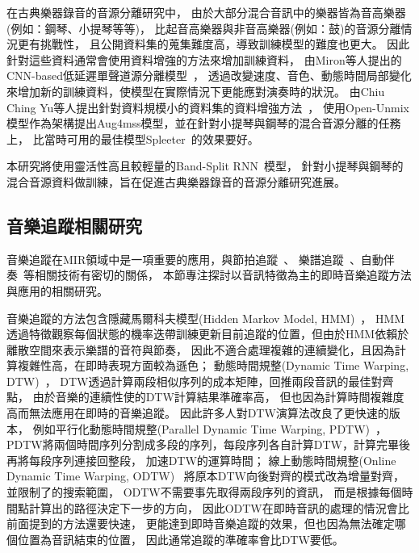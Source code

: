 \documentclass[class=NCU_thesis, crop=false]{standalone}
\begin{document}
在古典樂器錄音的音源分離研究中，
由於大部分混合音訊中的樂器皆為音高樂器(例如：鋼琴、小提琴等等)，
比起音高樂器與非音高樂器(例如：鼓)的音源分離情況更有挑戰性，
且公開資料集的蒐集難度高，導致訓練模型的難度也更大。
因此針對這些資料通常會使用資料增強的方法來增加訓練資料，
由Miron等人提出的CNN-based低延遲單聲道源分離模型~\cite{miron2017generating}，
透過改變速度、音色、動態時間局部變化來增加新的訓練資料，使模型在實際情況下更能應對演奏時的狀況。
由Chiu Ching Yu等人提出針對資料規模小的資料集的資料增強方法~\cite{Chiu_ChingYu2020MixingSpecific}，
使用Open-Unmix模型作為架構提出Aug4mss模型，並在針對小提琴與鋼琴的混合音源分離的任務上，
比當時可用的最佳模型Spleeter~\cite{hennequin2020spleeter}的效果要好。

本研究將使用靈活性高且較輕量的Band-Split RNN~\cite{Luo_Yi2022MusicSourceSeparation}模型，
針對小提琴與鋼琴的混合音源資料做訓練，旨在促進古典樂器錄音的音源分離研究進展。


\subsection{音樂追蹤相關研究}
音樂追蹤在MIR領域中是一項重要的應用，與節拍追蹤~\cite{heydari2021don, goto2021musical, di2021downbeat}、
樂譜追蹤~\cite{henkel2019score}、自動伴奏~\cite{zhang2023design}等相關技術有密切的關係，
本節專注探討以音訊特徵為主的即時音樂追蹤方法與應用的相關研究。

音樂追蹤的方法包含隱藏馬爾科夫模型(Hidden Markov Model, HMM)~\cite{cano1999score}，
HMM透過特徵觀察每個狀態的機率迭帶訓練更新目前追蹤的位置，但由於HMM依賴於離散空間來表示樂譜的音符與節奏，
因此不適合處理複雜的連續變化，且因為計算複雜性高，在即時表現方面較為遜色；
動態時間規整(Dynamic Time Warping, DTW)~\cite{Sakoe1978Dynamic, Arzt2012Adaptive}，
DTW透過計算兩段相似序列的成本矩陣，回推兩段音訊的最佳對齊點，
由於音樂的連續性使的DTW計算結果準確率高，
但也因為計算時間複雜度高而無法應用在即時的音樂追蹤。
因此許多人對DTW演算法改良了更快速的版本，
例如平行化動態時間規整(Parallel Dynamic Time Warping, PDTW)~\cite{takahashi2009parallelized, Wei2018Online}，
PDTW將兩個時間序列分割成多段的序列，每段序列各自計算DTW，計算完畢後再將每段序列連接回整段，
加速DTW的運算時間；
線上動態時間規整(Online Dynamic Time Warping, ODTW)~\cite{dixon2005ODTW, Arzt2010Towards, Lin2020AHumanComputerDuetSystem}
將原本DTW向後對齊的模式改為增量對齊，並限制了的搜索範圍，
ODTW不需要事先取得兩段序列的資訊，
而是根據每個時間點計算出的路徑決定下一步的方向，
因此ODTW在即時音訊的處理的情況會比前面提到的方法還要快速，
更能達到即時音樂追蹤的效果，但也因為無法確定哪個位置為音訊結束的位置，
因此通常追蹤的準確率會比DTW要低。
\end{document}
